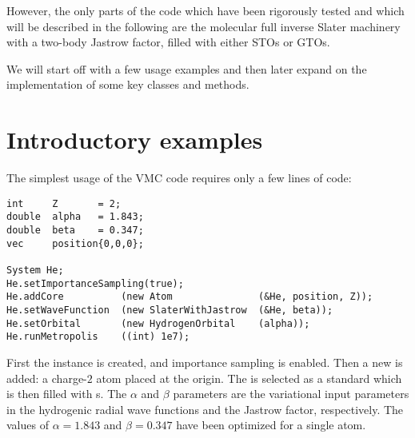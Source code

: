 \documentclass[../../master.tex]{subfiles}
\begin{document}
However, the only parts of the code which have been rigorously tested and which will be described in the following are the molecular full inverse Slater machinery with a two-body Jastrow factor, filled with either STOs or GTOs. 

We will start off with a few usage examples and then later expand on the implementation of some key classes and methods.

\section{Introductory examples\label{vmcexample}}
The simplest usage of the VMC code requires only a few lines of \CC{}  code:
\begin{lstlisting}[language={[std]c++}]
int     Z       = 2;
double  alpha   = 1.843;
double  beta    = 0.347;
vec     position{0,0,0};

System He;
He.setImportanceSampling(true);
He.addCore          (new Atom               (&He, position, Z));
He.setWaveFunction  (new SlaterWithJastrow  (&He, beta));
He.setOrbital       (new HydrogenOrbital    (alpha));
He.runMetropolis    ((int) 1e7);
\end{lstlisting}
First the  instance is created, and importance sampling is enabled. Then a new  is added: a charge-$2$ atom placed at the origin. The  is selected as a standard  which is then filled with s. The $\alpha$ and $\beta$ parameters are the variational input parameters in the hydrogenic radial wave functions and the Jastrow factor, respectively. The values of $\alpha=1.843$ and $\beta=0.347$ have been optimized for a single  atom.
\end{document}
